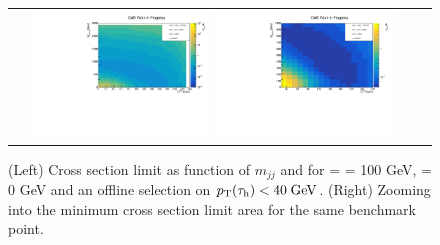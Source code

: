 \begin{figure}[tbh!]
	\centering
	\begin{tabular}{cc}
		\includegraphics[width=0.45\textwidth]{analysis/pics/JetInvMass_vs_MET_xsec_chi100_lsp000_taupt40.pdf}
		\includegraphics[width=0.45\textwidth]{analysis/pics/JetInvMass_vs_MET_xsec_chi100_lsp000_taupt40_zoom.pdf}
	\end{tabular}
	\caption{(Left) Cross section limit as function of $m_{jj}$ and \met for \charginopm = \neutralinotwo = 100 GeV, \neutralinoone = 0 GeV and an offline selection on $p_{\text{T}}(\tau_{\text{h}}) <  40\;\text{Ge}\kern-0.06667em\text{V}$. (Right) Zooming into the minimum cross section limit area for the same benchmark point.}
	\label{fig::JetInvMass_vs_MET_xsec_chi100_lsp000_taupt40}
\end{figure}

